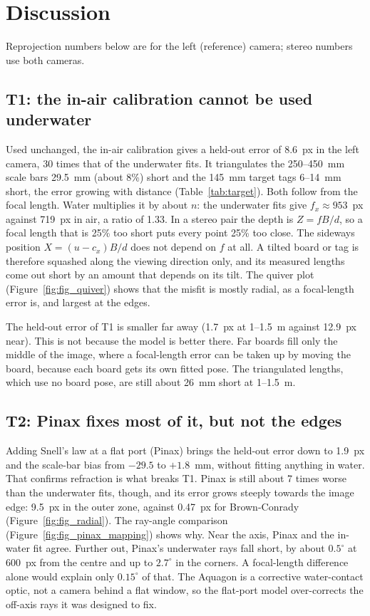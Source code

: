 \section{Discussion}
Reprojection numbers below are for the left (reference) camera; stereo numbers use both cameras.

\subsection{T1: the in-air calibration cannot be used underwater}
Used unchanged, the in-air calibration gives a held-out error of 8.6~px in the left camera, 30 times that
of the underwater fits. It triangulates the 250--450~mm scale bars 29.5~mm (about 8\%) short and the 145~mm
target tags 6--14~mm short, the error growing with distance (Table~\ref{tab:target}). Both follow from the
focal length. Water multiplies it by about $n$: the underwater fits give $f_x \approx 953$~px against
719~px in air, a ratio of 1.33. In a stereo pair the depth is $Z = fB/d$, so a focal length that is 25\%
too short puts every point 25\% too close. The sideways position $X = (u - c_x)B/d$ does not depend on $f$
at all. A tilted board or tag is therefore squashed along the viewing direction only, and its measured
lengths come out short by an amount that depends on its tilt. The quiver plot (Figure~\ref{fig:fig_quiver})
shows that the misfit is mostly radial, as a focal-length error is, and largest at the edges.

The held-out error of T1 is smaller far away (1.7~px at 1--1.5~m against 12.9~px near). This is not because
the model is better there. Far boards fill only the middle of the image, where a focal-length error can be
taken up by moving the board, because each board gets its own fitted pose. The triangulated lengths, which
use no board pose, are still about 26~mm short at 1--1.5~m.

\subsection{T2: Pinax fixes most of it, but not the edges}
Adding Snell's law at a flat port (Pinax) brings the held-out error down to 1.9~px and the scale-bar bias
from $-29.5$ to $+1.8$~mm, without fitting anything in water. That confirms refraction is what breaks T1.
Pinax is still about 7 times worse than the underwater fits, though, and its error grows steeply towards the
image edge: 9.5~px in the outer zone, against 0.47~px for Brown-Conrady
(Figure~\ref{fig:fig_radial}). The ray-angle comparison (Figure~\ref{fig:fig_pinax_mapping}) shows why.
Near the axis, Pinax and the in-water fit agree. Further out, Pinax's underwater rays fall short, by about
$0.5^\circ$ at 600~px from the centre and up to $2.7^\circ$ in the corners. A focal-length difference alone
would explain only $0.15^\circ$ of that. The Aquagon is a corrective water-contact optic, not a camera
behind a flat window, so the flat-port model over-corrects the off-axis rays it was designed to fix.

